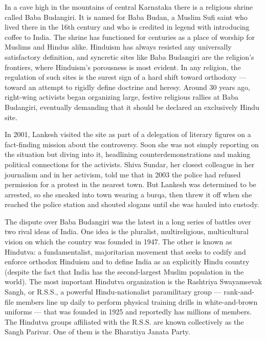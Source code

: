 In a cave high in the mountains of central Karnataka there is a
religious shrine called Baba Budangiri. It is named for Baba Budan, a
Muslim Sufi saint who lived there in the 16th century and who is
credited in legend with introducing coffee to India. The shrine has
functioned for centuries as a place of worship for Muslims and Hindus
alike. Hinduism has always resisted any universally satisfactory
definition, and syncretic sites like Baba Budangiri are the religion's
frontiers, where Hinduism's porousness is most evident. In any religion,
the regulation of such sites is the surest sign of a hard shift toward
orthodoxy --- toward an attempt to rigidly define doctrine and heresy.
Around 30 years ago, right-wing activists began organizing large,
festive religious rallies at Baba Budangiri, eventually demanding that
it should be declared an exclusively Hindu site.

In 2001, Lankesh visited the site as part of a delegation of literary
figures on a fact-finding mission about the controversy. Soon she was
not simply reporting on the situation but diving into it, headlining
counterdemonstrations and making political connections for the
activists. Shiva Sundar, her closest colleague in her journalism and in
her activism, told me that in 2003 the police had refused permission for
a protest in the nearest town. But Lankesh was determined to be
arrested, so she sneaked into town wearing a burqa, then threw it off
when she reached the police station and shouted slogans until she was
hauled into custody.

The dispute over Baba Budangiri was the latest in a long series of
battles over two rival ideas of India. One idea is the pluralist,
multireligious, multicultural vision on which the country was founded in
1947. The other is known as Hindutva: a fundamentalist, majoritarian
movement that seeks to codify and enforce orthodox Hinduism and to
define India as an explicitly Hindu country (despite the fact that India
has the second-largest Muslim population in the world). The most
important Hindutva organization is the Rashtriya Swayamsevak Sangh, or
R.S.S., a powerful Hindu-nationalist paramilitary group ---
rank-and-file members line up daily to perform physical training drills
in white-and-brown uniforms --- that was founded in 1925 and reportedly
has millions of members. The Hindutva groups affiliated with the R.S.S.
are known collectively as the Sangh Parivar. One of them is the
Bharatiya Janata Party.

